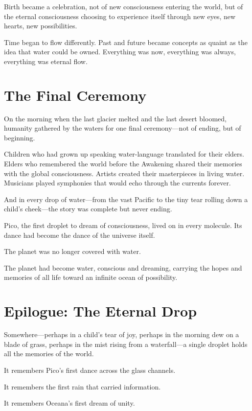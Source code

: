 \documentclass[12pt,a4paper]{book}
\begin{document}
Birth became a celebration, not of new consciousness entering the world, but of the eternal consciousness choosing to experience itself through new eyes, new hearts, new possibilities.

Time began to flow differently. Past and future became concepts as quaint as the idea that water could be owned. Everything was now, everything was always, everything was eternal flow.

\section{The Final Ceremony}

On the morning when the last glacier melted and the last desert bloomed, humanity gathered by the waters for one final ceremony—not of ending, but of beginning.

Children who had grown up speaking water-language translated for their elders. Elders who remembered the world before the Awakening shared their memories with the global consciousness. Artists created their masterpieces in living water. Musicians played symphonies that would echo through the currents forever.

And in every drop of water—from the vast Pacific to the tiny tear rolling down a child's cheek—the story was complete but never ending.

Pico, the first droplet to dream of consciousness, lived on in every molecule. Its dance had become the dance of the universe itself.

The planet was no longer covered with water.

The planet had become water, conscious and dreaming, carrying the hopes and memories of all life toward an infinite ocean of possibility.

\section{Epilogue: The Eternal Drop}

Somewhere—perhaps in a child's tear of joy, perhaps in the morning dew on a blade of grass, perhaps in the mist rising from a waterfall—a single droplet holds all the memories of the world.

It remembers Pico's first dance across the glass channels.

It remembers the first rain that carried information.

It remembers Oceana's first dream of unity.
\end{document}
